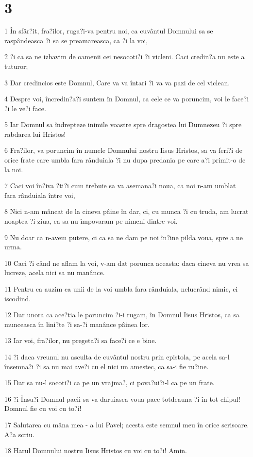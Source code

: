 \chapter{3}

\par 1 În sfâr?it, fra?ilor, ruga?i-va pentru noi, ca cuvântul Domnului sa se raspândeasca ?i sa se preamareasca, ca ?i la voi,
\par 2 ?i ca sa ne izbavim de oamenii cei nesocoti?i ?i vicleni. Caci credin?a nu este a tuturor;
\par 3 Dar credincios este Domnul, Care va va întari ?i va va pazi de cel viclean.
\par 4 Despre voi, încredin?a?i suntem în Domnul, ca cele ce va poruncim, voi le face?i ?i le ve?i face.
\par 5 Iar Domnul sa îndrepteze inimile voastre spre dragostea lui Dumnezeu ?i spre rabdarea lui Hristos!
\par 6 Fra?ilor, va poruncim în numele Domnului nostru Iisus Hristos, sa va feri?i de orice frate care umbla fara rânduiala ?i nu dupa predania pe care a?i primit-o de la noi.
\par 7 Caci voi în?iva ?ti?i cum trebuie sa va asemana?i noua, ca noi n-am umblat fara rânduiala între voi,
\par 8 Nici n-am mâncat de la cineva pâine în dar, ci, cu munca ?i cu truda, am lucrat noaptea ?i ziua, ca sa nu împovaram pe nimeni dintre voi.
\par 9 Nu doar ca n-avem putere, ci ca sa ne dam pe noi în?ine pilda voua, spre a ne urma.
\par 10 Caci ?i când ne aflam la voi, v-am dat porunca aceasta: daca cineva nu vrea sa lucreze, acela nici sa nu manânce.
\par 11 Pentru ca auzim ca unii de la voi umbla fara rânduiala, nelucrând nimic, ci iscodind.
\par 12 Dar unora ca ace?tia le poruncim ?i-i rugam, în Domnul Iisus Hristos, ca sa munceasca în lini?te ?i sa-?i manânce pâinea lor.
\par 13 Iar voi, fra?ilor, nu pregeta?i sa face?i ce e bine.
\par 14 ?i daca vreunul nu asculta de cuvântul nostru prin epistola, pe acela sa-l însemna?i ?i sa nu mai ave?i cu el nici un amestec, ca sa-i fie ru?ine.
\par 15 Dar sa nu-l socoti?i ca pe un vrajma?, ci pova?ui?i-l ca pe un frate.
\par 16 ?i Însu?i Domnul pacii sa va daruiasca voua pace totdeauna ?i în tot chipul! Domnul fie cu voi cu to?i!
\par 17 Salutarea cu mâna mea - a lui Pavel; acesta este semnul meu în orice scrisoare. A?a scriu.
\par 18 Harul Domnului nostru Iisus Hristos cu voi cu to?i! Amin.


